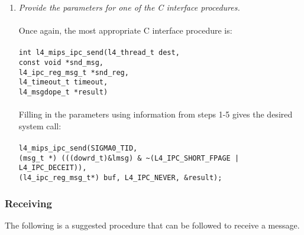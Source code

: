 \begin{enumerate}
\item \emph{Provide the parameters for one of the C interface 
    procedures.} \\ \\ \hspace*{10pt}
  Once again, the most appropriate C interface procedure is:\\ \\
  \hspace*{20pt} {\footnotesize\verb+int l4_mips_ipc_send(l4_thread_t dest,+} \\ 
  \hspace*{130pt} {\footnotesize\verb+const void *snd_msg,+} \\
  \hspace*{130pt} {\footnotesize\verb+l4_ipc_reg_msg_t *snd_reg,+}\\ 
  \hspace*{130pt} {\footnotesize\verb+l4_timeout_t timeout,+}\\ 
  \hspace*{130pt} {\footnotesize\verb+l4_msgdope_t *result)+}\\ \\
  \hspace*{10pt} Filling in the parameters using information from steps
  1-5 gives the desired system call: \\ \\
  \hspace*{20pt} {\footnotesize\verb+l4_mips_ipc_send(SIGMA0_TID,+}\\
  \hspace*{80pt} {\footnotesize\verb+(msg_t *) (((dowrd_t)&lmsg) & ~(L4_IPC_SHORT_FPAGE | L4_IPC_DECEIT)),+}\\
  \hspace*{80pt} {\footnotesize\verb+(l4_ipc_reg_msg_t*) buf, L4_IPC_NEVER, &result);+}
  
\end{enumerate}


\subsubsection{Receiving}



The following is a suggested procedure that can be followed to receive
a message.

